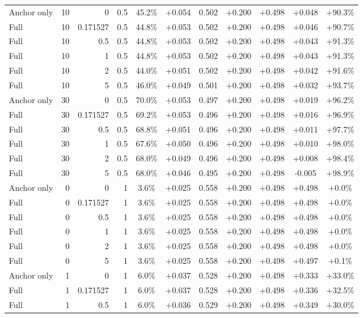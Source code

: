 \begin{table}[htbp]
\begin{tabular}{lrrrccccccc}
Anchor only & 10 & 0 & 0.5 & 45.2\% & +0.054 & 0.502 & +0.200 & +0.498 & +0.048 & +90.3\% \\
Full & 10 & 0.171527 & 0.5 & 44.8\% & +0.053 & 0.502 & +0.200 & +0.498 & +0.046 & +90.7\% \\
Full & 10 & 0.5 & 0.5 & 44.8\% & +0.053 & 0.502 & +0.200 & +0.498 & +0.043 & +91.3\% \\
Full & 10 & 1 & 0.5 & 44.8\% & +0.053 & 0.502 & +0.200 & +0.498 & +0.043 & +91.3\% \\
Full & 10 & 2 & 0.5 & 44.0\% & +0.051 & 0.502 & +0.200 & +0.498 & +0.042 & +91.6\% \\
Full & 10 & 5 & 0.5 & 46.0\% & +0.049 & 0.501 & +0.200 & +0.498 & +0.032 & +93.7\% \\
Anchor only & 30 & 0 & 0.5 & 70.0\% & +0.053 & 0.497 & +0.200 & +0.498 & +0.019 & +96.2\% \\
Full & 30 & 0.171527 & 0.5 & 69.2\% & +0.053 & 0.496 & +0.200 & +0.498 & +0.016 & +96.9\% \\
Full & 30 & 0.5 & 0.5 & 68.8\% & +0.051 & 0.496 & +0.200 & +0.498 & +0.011 & +97.7\% \\
Full & 30 & 1 & 0.5 & 67.6\% & +0.050 & 0.496 & +0.200 & +0.498 & +0.010 & +98.0\% \\
Full & 30 & 2 & 0.5 & 68.0\% & +0.049 & 0.496 & +0.200 & +0.498 & +0.008 & +98.4\% \\
Full & 30 & 5 & 0.5 & 68.0\% & +0.046 & 0.495 & +0.200 & +0.498 & -0.005 & +98.9\% \\
Anchor only & 0 & 0 & 1 & 3.6\% & +0.025 & 0.558 & +0.200 & +0.498 & +0.498 & +0.0\% \\
Full & 0 & 0.171527 & 1 & 3.6\% & +0.025 & 0.558 & +0.200 & +0.498 & +0.498 & +0.0\% \\
Full & 0 & 0.5 & 1 & 3.6\% & +0.025 & 0.558 & +0.200 & +0.498 & +0.498 & +0.0\% \\
Full & 0 & 1 & 1 & 3.6\% & +0.025 & 0.558 & +0.200 & +0.498 & +0.498 & +0.0\% \\
Full & 0 & 2 & 1 & 3.6\% & +0.025 & 0.558 & +0.200 & +0.498 & +0.498 & +0.0\% \\
Full & 0 & 5 & 1 & 3.6\% & +0.025 & 0.558 & +0.200 & +0.498 & +0.497 & +0.1\% \\
Anchor only & 1 & 0 & 1 & 6.0\% & +0.037 & 0.528 & +0.200 & +0.498 & +0.333 & +33.0\% \\
Full & 1 & 0.171527 & 1 & 6.0\% & +0.037 & 0.528 & +0.200 & +0.498 & +0.336 & +32.5\% \\
Full & 1 & 0.5 & 1 & 6.0\% & +0.036 & 0.529 & +0.200 & +0.498 & +0.349 & +30.0\% \\

\end{tabular}
\end{table}
